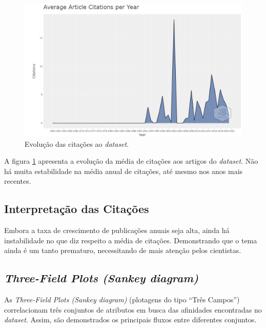 \begin{figure}
    \centering
    \includegraphics[angle=0,width=1\textwidth]{experiments/titofrota/PesquisaBibliometrica/Deepfakes/citations-year-plot.png}
    \caption{Evolução das citações ao \textit{dataset}.}
    \label{fig:evol:anual:citacoes:DEEPFAKES@titofrota}
\end{figure}

A figura \ref{fig:evol:anual:citacoes:DEEPFAKES@titofrota} apresenta a evolução da média de citações aos artigos do \textit{dataset}. Não há muita estabilidade na média anual de citações, até mesmo nos anos mais recentes.

\subsection{Interpretação das Citações}
Embora a taxa de crescimento de publicações anuais seja alta, ainda há instabilidade no que diz respeito a média de citações. Demonstrando que o tema ainda é um tanto prematuro, necessitando de mais atenção pelos cientistas.

\subsection{\textit{Three-Field Plots (Sankey diagram)}}

As \textit{Three-Field Plots (Sankey diagram)} (plotagens do tipo ``Três Campos'') correlacionam três conjuntos de atributos em busca das afinidades encontradas no \textit{dataset}. Assim, são demonstrados os principais fluxos entre diferentes conjuntos.

